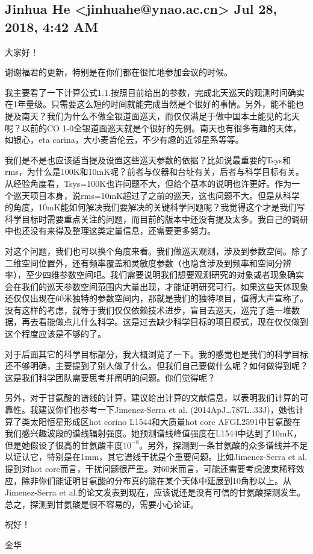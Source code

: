 \documentclass{article}
\newcommand\from[2]{\subsection{{#1} {#2}}}
\newcommand\said[1]{#1}
\begin{document}
\from{
Jinhua He <jinhuahe@ynao.ac.cn>
}{
Jul 28, 2018, 4:42 AM
}
\said{
大家好！

谢谢福君的更新，特别是在你们都在很忙地参加会议的时候。

我主要看了一下计算公式1.1.按照目前给出的参数，完成北天巡天的观测时间确实在1年量级。只需要这么短的时间就能完成当然是个很好的事情。另外，能不能也提及南天？我们为什么不做全银道面巡天，而仅仅满足于做中国本土能见的北天呢？以前的CO 1-0全银道面巡天就是个很好的先例。南天也有很多有趣的天体，如银心，eta carina，大小麦哲伦云，不少有趣的近邻星系等等。

我们是不是也应该适当提及设置这些巡天参数的依据？比如说最重要的Tsys和rms，为什么是100K和10mK呢？前者与仪器和台址有关，后者与科学目标有关。从经验角度看，Tsys=100K也许问题不大，但给个基本的说明也许更好。作为一个巡天项目本身，说rms=10mK超过了之前的巡天，这也问题不大。但是从科学的角度，10mK能如何解决我们要解决的关键科学问题呢？我觉得这个才是我们写科学目标时需要重点关注的问题，而目前的版本中还没有提及太多。我自己的调研中也还没有来得及整理这类定量信息，还需要更多努力。

对这个问题，我们也可以换个角度来看。我们做巡天观测，涉及到参数空间。除了二维空间位置外，还有频率覆盖和灵敏度参数（也隐含涉及到频率和空间分辨率），至少四维参数空间吧。我们需要说明我们想要观测研究的对象或者现象确实会在我们的巡天参数空间范围内大量出现，才能证明研究可行。如果这些天体现象还仅仅出现在60米独特的参数空间内，那就是我们的独特项目，值得大声宣称了。没有这样的考虑，就等于我们仅仅依赖技术进步，盲目去巡天，巡完了造一堆数据，再去看能做点儿什么科学。这是过去缺少科学目标的项目模式，现在仅仅做到这个程度应该是不够的了。

对于后面其它的科学目标部分，我大概浏览了一下。我的感觉也是我们的科学目标还不够明确，主要提到了别人做了什么。但我们自己要做什么呢？如何做得到呢？这是我们科学团队需要思考并阐明的问题。你们觉得呢？

另外，对于甘氨酸的谱线的计算，建议给出计算的文献信息，以表明我们计算的可靠性。我建议你们也参考一下Jimenez-Serra et al. (2014ApJ…787L..33J)，她也计算了类太阳恒星形成区hot corino L1544和大质量hot core AFGL2591中甘氨酸在我们感兴趣波段的谱线辐射强度。她预测谱线峰值强度在L1544中达到了10mK，但是她假设了很高的甘氨酸丰度$10^{-8}$。另外，探测到一条甘氨酸的众多谱线并不足以证认它，特别是在1mm，其它谱线干扰是个重要问题。比如Jimenez-Serra et al.提到对hot core而言，干扰问题很严重。对60米而言，可能还需要考虑波束稀释效应，除非你们能证明甘氨酸的分布真的能在某个天体中延展到10角秒以上。从Jimenez-Serra et al.的论文发表到现在，应该说还是没有可信的甘氨酸探测发生。总之，探测到甘氨酸是很不容易的，需要小心论证。

祝好！

金华
}
\end{document}

